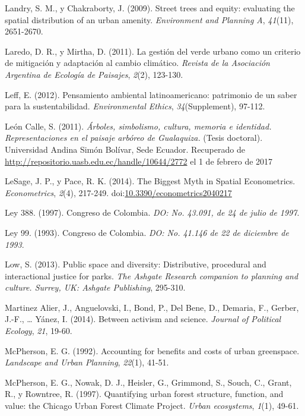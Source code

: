 \documentclass[12pt,a4paper,openany]{book}
\theoremstyle{definition}
\theoremstyle{definition}
\theoremstyle{definition}
\theoremstyle{remark}
\begin{document}
\hypertarget{ref-landry_street_2009}{}
Landry, S. M., y Chakraborty, J. (2009). Street trees and equity:
evaluating the spatial distribution of an urban amenity.
\emph{Environment and Planning A}, \emph{41}(11), 2651-2670.

\hypertarget{ref-laredo_gestion_2011}{}
Laredo, D. R., y Mirtha, D. (2011). La gestión del verde urbano como un
criterio de mitigación y adaptación al cambio climático. \emph{Revista
de la Asociación Argentina de Ecología de Paisajes}, \emph{2}(2),
123-130.

\hypertarget{ref-leff_pensamiento_2012}{}
Leff, E. (2012). Pensamiento ambiental latinoamericano: patrimonio de un
saber para la sustentabilidad. \emph{Environmental Ethics},
\emph{34}(Supplement), 97-112.

\hypertarget{ref-leon_calle_arboles_2011}{}
León Calle, S. (2011). \emph{Árboles, simbolismo, cultura, memoria e
identidad. Representaciones en el paisaje arbóreo de Gualaquiza.}
(Tesis doctoral). Universidad Andina Simón Bolívar, Sede Ecuador.
Recuperado de \url{http://repositorio.uasb.edu.ec/handle/10644/2772} el
1 de febrero de 2017

\hypertarget{ref-lesage_biggest_2014}{}
LeSage, J. P., y Pace, R. K. (2014). The Biggest Myth in Spatial
Econometrics. \emph{Econometrics}, \emph{2}(4), 217-249.
doi:\href{https://doi.org/10.3390/econometrics2040217}{10.3390/econometrics2040217}

\hypertarget{ref-ley388col}{}
Ley 388. (1997). Congreso de Colombia. \emph{DO: No. 43.091, de 24 de
julio de 1997}.

\hypertarget{ref-ley99col}{}
Ley 99. (1993). Congreso de Colombia. \emph{DO: No. 41.146 de 22 de
diciembre de 1993}.

\hypertarget{ref-low_public_2013}{}
Low, S. (2013). Public space and diversity: Distributive, procedural and
interactional justice for parks. \emph{The Ashgate Research companion to
planning and culture. Surrey, UK: Ashgate Publishing}, 295-310.

\hypertarget{ref-martinez_alier_between_2014}{}
Martinez Alier, J., Anguelovski, I., Bond, P., Del Bene, D., Demaria,
F., Gerber, J.-F., \ldots{} Yánez, I. (2014). Between activism and
science. \emph{Journal of Political Ecology}, \emph{21}, 19-60.

\hypertarget{ref-mcpherson1992accounting}{}
McPherson, E. G. (1992). Accounting for benefits and costs of urban
greenspace. \emph{Landscape and Urban Planning}, \emph{22}(1), 41-51.

\hypertarget{ref-mcpherson_quantifying_1997}{}
McPherson, E. G., Nowak, D. J., Heisler, G., Grimmond, S., Souch, C.,
Grant, R., y Rowntree, R. (1997). Quantifying urban forest structure,
function, and value: the Chicago Urban Forest Climate Project.
\emph{Urban ecosystems}, \emph{1}(1), 49-61.
\end{document}
